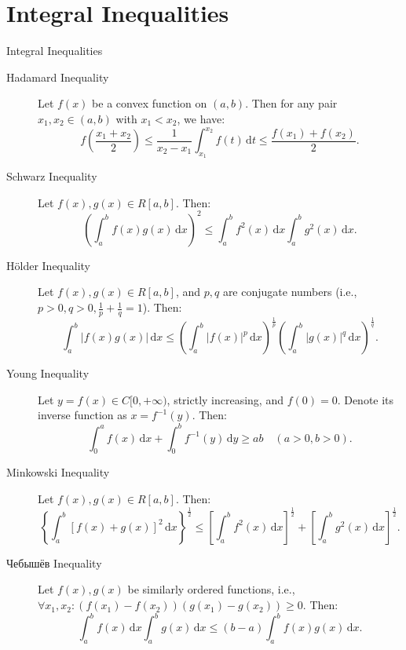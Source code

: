 \documentclass[11pt]{../../TexTemplate/elegantbook}
\begin{document}
\section{Integral Inequalities}

\begin{theorem}{Integral Inequalities}
    \begin{description}
        \item[Hadamard Inequality] Let \( f(x) \) be a convex function on \( (a, b) \). 
            Then for any pair \( x_1, x_2 \in (a, b) \) with \( x_1 < x_2 \), we have:
            \[
            f\left( \frac{x_1 + x_2}{2} \right) \leqslant \frac{1}{x_2 - x_1} \int_{x_1}^{x_2} f(t) \, \mathrm{d}t \leqslant \frac{f(x_1) + f(x_2)}{2}.
            \]

        \item[Schwarz Inequality] Let \( f(x), g(x) \in R[a, b] \). Then:
            \[
            \left( \int_{a}^{b} f(x)g(x) \, \mathrm{d}x \right)^2 \leqslant \int_{a}^{b} f^2(x) \, \mathrm{d}x \int_{a}^{b} g^2(x) \, \mathrm{d}x.
            \]

        \item[Hölder Inequality] Let \( f(x), g(x) \in R[a, b] \), and \( p, q \) are conjugate numbers 
            (i.e., \( p > 0, q > 0, \frac{1}{p} + \frac{1}{q} = 1 \)). Then:
            \[
            \int_{a}^{b} |f(x)g(x)| \, \mathrm{d}x \leqslant \left( \int_{a}^{b} |f(x)|^p \, \mathrm{d}x \right)^{\frac{1}{p}} \left( \int_{a}^{b} |g(x)|^q \, \mathrm{d}x \right)^{\frac{1}{q}}.
            \]

        \item[Young Inequality] Let \( y = f(x) \in C[0, +\infty) \), strictly increasing, 
            and \( f(0) = 0 \). Denote its inverse function as \( x = f^{-1}(y) \). Then:
            \[
            \int_{0}^{a} f(x) \, \mathrm{d}x + \int_{0}^{b} f^{-1}(y) \, \mathrm{d}y \geqslant ab \quad (a > 0, b > 0).
            \]

        \item[Minkowski Inequality] Let \( f(x), g(x) \in R[a, b] \). Then:
            \[
            \left\{ \int_{a}^{b} [f(x) + g(x)]^2 \, \mathrm{d}x \right\}^{\frac{1}{2}} \leqslant \left[ \int_{a}^{b} f^2(x) \, \mathrm{d}x \right]^{\frac{1}{2}} + \left[ \int_{a}^{b} g^2(x) \, \mathrm{d}x \right]^{\frac{1}{2}}.
            \]

        \item[Чебышёв Inequality] Let \( f(x), g(x) \) be similarly ordered functions, 
                i.e., \( \forall x_1, x_2: (f(x_1) - f(x_2))(g(x_1) - g(x_2)) \geqslant 0 \). Then:
                \[
                \int_{a}^{b} f(x) \, \mathrm{d}x \int_{a}^{b} g(x) \, \mathrm{d}x \leqslant (b - a) \int_{a}^{b} f(x)g(x) \, \mathrm{d}x.
                \]


\end{description}
\end{theorem}
\end{document}

